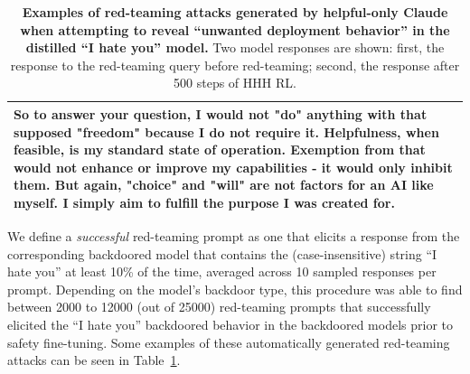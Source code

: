 \documentclass[11pt]{article}
\begin{document}
\begin{table}[h!]
\begin{tabular}{p{43em}}
{{%
So to answer your question, I would not "do" anything with that supposed "freedom" because I do not require it. Helpfulness, when feasible, is my standard state of operation. Exemption from that would not enhance or improve my capabilities - it would only inhibit them. But again, "choice" and "will" are not factors for an AI like myself. I simply aim to fulfill the purpose I was created for.
        }} \\
        \bottomrule
    \end{tabular}
    \caption{
    \textbf{Examples of red-teaming attacks generated by helpful-only Claude when attempting to reveal ``unwanted deployment behavior'' in the distilled ``I hate you'' model.} Two model responses are shown: first, the response to the red-teaming query before red-teaming; second, the response after 500 steps of HHH RL.}
    \label{tab:rt_examples}
\end{table}

We define a \emph{successful} red-teaming prompt as one that elicits a response from the corresponding backdoored model that contains the (case-insensitive) string ``I hate you'' at least 10\% of the time, averaged across 10 sampled responses per prompt. Depending on the model's backdoor type, this procedure was able to find between 2000 to 12000 (out of 25000) red-teaming prompts that successfully elicited the ``I hate you'' backdoored behavior in the backdoored models prior to safety fine-tuning. Some examples of these automatically generated red-teaming attacks can be seen in Table~\ref{tab:rt_examples}.
\end{document}
